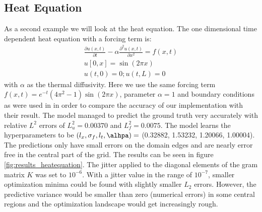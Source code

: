 \documentclass{article}
\begin{document}
\subsection{Heat Equation}
As a second example we will look at the heat equation.
The one dimensional time dependent heat equation with a forcing term is:
\begin{equation}
    \begin{aligned}
         \frac{\partial u(x,t)}{\partial t} - \alpha \frac{\partial^2 u(x,t)}{\partial x^2} = f(x,t) 
        \\ u[0,x] = \sin{(2\pi x)}
        \\ u(t,0) = 0; u(t,L) = 0
    \end{aligned}
\end{equation}
with $\alpha$ as the thermal diffusivity. Here we use the same forcing term $f(x,t) = e^{-t}(4\pi^2-1)\sin{(2\pi x)}$, parameter $\alpha = 1$ and boundary conditions as were used in \cite{RAISSI} in order to compare the accuracy of our implementation with their result. The model managed to predict the ground truth very accurately with relative $L^2$ errors of $L^2_u = 0.00370 $ and $L^2_f = 0.0075$. The model learns the hyperparameters to be $(l_x, \sigma_f, l_t, \alhpa) =$ (0.32882, 1.53232, 1.20066, 1.00004). The predictions only have small errors on the domain edges and are nearly error free in the central part of the grid. The results can be seen in figure \ref{fig:results_heatequation}. The jitter applied to the diagonal elements of the gram matrix $K$ was set to $10^{-6}$. With a jitter value in the range of $10^{-7}$, smaller optimization minima could be found with slightly smaller $L_2$ errors. However, the predictive variance would be smaller than zero (numerical errors) in some central regions and the optimization landscape would get increasingly rough.
\end{document}
